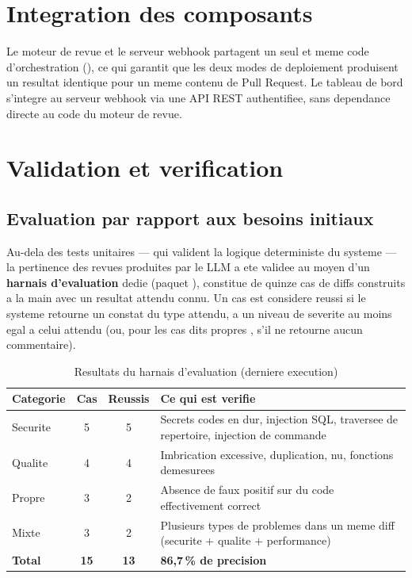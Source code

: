 \documentclass[a4paper,12pt,oneside]{report}
\newcommand{\tablesetup}{\small\singlespacing\renewcommand{\arraystretch}{1.25}}
\begin{document}
\section{Integration des composants}

Le moteur de revue et le serveur webhook partagent un seul et meme code d'orchestration (), ce qui garantit que les deux modes de deploiement produisent un resultat identique pour un meme contenu de Pull Request. Le tableau de bord s'integre au serveur webhook via une API REST authentifiee, sans dependance directe au code du moteur de revue.

\section{Validation et verification}

\subsection{Evaluation par rapport aux besoins initiaux}

Au-dela des tests unitaires --- qui valident la logique deterministe du systeme --- la pertinence des revues produites par le LLM a ete validee au moyen d'un \textbf{harnais d'evaluation} dedie (paquet ), constitue de quinze cas de diffs construits a la main avec un resultat attendu connu. Un cas est considere reussi si le systeme retourne un constat du type attendu, a un niveau de severite au moins egal a celui attendu (ou, pour les cas dits \og propres \fg, s'il ne retourne aucun commentaire).

\begin{table}[H]
\centering
\tablesetup
\begin{tabular}{L{2.4cm}cc L{8.4cm}}
\toprule
\textbf{Categorie} & \textbf{Cas} & \textbf{Reussis} & \textbf{Ce qui est verifie} \\
\midrule
Securite & 5 & 5 & Secrets codes en dur, injection SQL, traversee de repertoire, injection de commande \\
Qualite & 4 & 4 & Imbrication excessive, duplication,  nu, fonctions demesurees \\
Propre & 3 & 2 & Absence de faux positif sur du code effectivement correct \\
Mixte & 3 & 2 & Plusieurs types de problemes dans un meme diff (securite + qualite + performance) \\
\midrule
\textbf{Total} & \textbf{15} & \textbf{13} & \textbf{86,7\,\% de precision} \\
\bottomrule
\end{tabular}
\caption{Resultats du harnais d'evaluation (derniere execution)}
\label{tab:eval}
\end{table}
\end{document}
